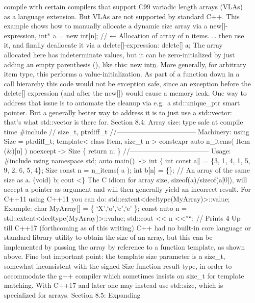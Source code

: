 compile with certain compilers that support C99 variadic length arrays
(VLAs) as a language extension. But VLAs are not supported by standard
C++. This example shows how to manually allocate a dynamic size array
via a new{[}{]}-expression, int* a = new int{[}n{]}; // ← Allocation of
array of n items. \ldots{} then use it, and finally deallocate it via a
delete{[}{]}-expression: delete{[}{]} a; The array allocated here has
indeterminate values, but it can be zero-initialized by just adding an
empty parenthesis (), like this: new int\href{}{n}. More generally, for
arbitrary item type, this performs a value-initialization. As part of a
function down in a call hierarchy this code would not be exception safe,
since an exception before the delete{[}{]} expression (and after the
new{[}{]}) would cause a memory leak. One way to address that issue is
to automate the cleanup via e.g.~a std::unique\_ptr smart pointer. But a
generally better way to address it is to just use a std::vector: that's
what std::vector is there for. Section 8.4: Array size: type safe at
compile time \#include // size\_t, ptrdiff\_t
//----------------------------------- Machinery: using Size =
ptrdiff\_t; template\textless{} class Item, size\_t n \textgreater{}
constexpr auto n\_items( Item (\&){[}n{]} ) noexcept -\textgreater{}
Size \{ return n; \} //----------------------------------- Usage:
\#include using namespace std; auto main() -\textgreater{} int \{ int
const a{[}{]} = \{3, 1, 4, 1, 5, 9, 2, 6, 5, 4\}; Size const n =
n\_items( a ); int b{[}n{]} = \{\}; // An array of the same size as a.
(void) b; cout \textless\} The C idiom for array size,
sizeof(a)/sizeof(a{[}0{]}), will accept a pointer as argument and will
then generally yield an incorrect result. For C++11 using C++11 you can
do: std::extent\textless decltype(MyArray)\textgreater::value; Example:
char MyArray{[}{]} = \{ `X',`o',`c',`e' \}; const auto n =
std::extent\textless decltype(MyArray)\textgreater::value; std::cout
\textless\textless{} n \textless\textless{}''\n``; // Prints 4 Up till
C++17 (forthcoming as of this writing) C++ had no built-in core language
or standard library utility to obtain the size of an array, but this can
be implemented by passing the array by reference to a function template,
as shown above. Fine but important point: the template size parameter is
a size\_t, somewhat inconsistent with the signed Size function result
type, in order to accommodate the g++ compiler which sometimes insists
on size\_t for template matching. With C++17 and later one may instead
use std::size, which is specialized for arrays. Section 8.5: Expanding
